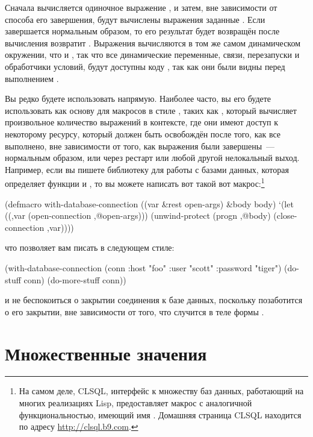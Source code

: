 Сначала вычисляется одиночное выражение , и затем, вне зависимости от
способа его завершения, будут вычислены выражения заданные .  Если
 завершается нормальным образом, то его результат будет возвращён
 после вычисления возвратит . Выражения
 вычисляются в том же самом динамическом окружении, что и
, так что все динамические переменные, связи, перезапуски и
обработчики условий, будут доступны коду , так как они были видны
перед выполнением .

Вы редко будете использовать  напрямую.  Наиболее часто, вы его
будете использовать как основу для макросов в стиле , таких как
, который вычисляет произвольное количество выражений в контексте,
где они имеют доступ к некоторому ресурсу, который должен быть освобождён после того, как
все выполнено, вне зависимости от того, как выражения были завершены~--- нормальным
образом, или через рестарт или любой другой нелокальный выход.  Например, если вы пишете
библиотеку для работы с базами данных, которая определяет функции  и
, то вы можете написать вот такой вот макрос:\footnote{На самом
  деле, CLSQL, интерфейс к множеству баз данных, работающий на многих реализациях Lisp,
  предоставляет макрос с аналогичной функциональностью, имеющий имя .
  Домашняя страница CLSQL находится по адресу \url{http://clsql.b9.com}.}

\begin{myverb}
(defmacro with-database-connection ((var &rest open-args) &body body)
  `(let ((,var (open-connection ,@open-args)))
    (unwind-protect (progn ,@body)
      (close-connection ,var))))
\end{myverb}

что позволяет вам писать в следующем стиле:

\begin{myverb}
(with-database-connection (conn :host "foo" :user "scott" :password "tiger")
  (do-stuff conn)
  (do-more-stuff conn))
\end{myverb}

и не беспокоиться о закрытии соединения к базе данных, поскольку 
позаботится о его закрытии, вне зависимости от того, что случится в теле формы
.

\section{Множественные значения}

